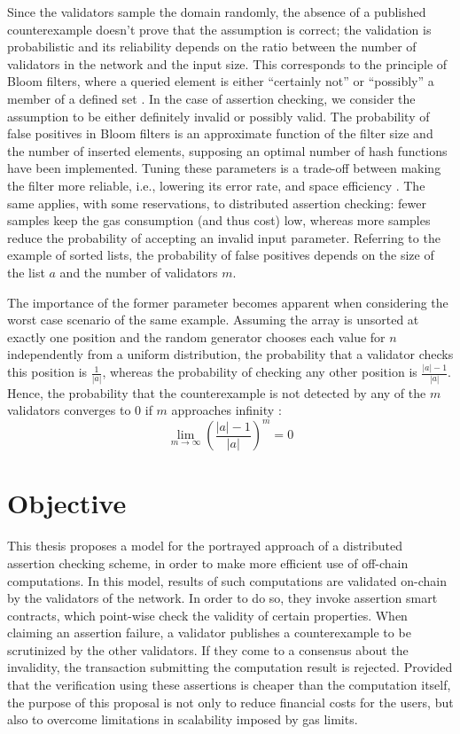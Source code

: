 Since the validators sample the domain randomly, the absence of a published counterexample doesn't prove that the assumption is correct; the validation is probabilistic and its reliability depends on the ratio between the number of validators in the network and the input size. This corresponds to the principle of Bloom filters, where a queried element is either ``certainly not'' or ``possibly'' a member of a defined set \cite{blustein_bloom_2002}. In the case of assertion checking, we consider the assumption to be either definitely invalid or possibly valid. The probability of false positives in Bloom filters is an approximate function of the filter size and the number of inserted elements, supposing an optimal number of hash functions have been implemented. Tuning these parameters is a trade-off between making the filter more reliable, i.e., lowering its error rate, and space efficiency \cite{blustein_bloom_2002}. The same applies, with some reservations, to distributed assertion checking: fewer samples keep the gas consumption (and thus cost) low, whereas more samples reduce the probability of accepting an invalid input parameter. Referring to the example of sorted lists, the probability of false positives depends on the size of the list $a$ and the number of validators $m$.

The importance of the former parameter becomes apparent when considering the worst case scenario of the same example. Assuming the array is unsorted at exactly one position and the random generator chooses each value for $n$ independently from a uniform distribution, the probability that a validator checks this position is $\frac{1}{|a|}$, whereas the probability of checking any other position is $\frac{|a|-1}{|a|}$. Hence, the probability that the counterexample is not detected by any of the $m$ validators converges to 0 if $m$ approaches infinity \cite{thiemann_2020}:
\begin{equation}\label{eq:limes_validators}
	\lim_{m\to\infty} \left(\frac{|a|-1}{|a|}\right)^m = 0
\end{equation}

\section{Objective}
This thesis proposes a model for the portrayed approach of a distributed assertion checking scheme, in order to make more efficient use of off-chain computations. In this model, results of such computations are validated on-chain by the validators of the network. In order to do so, they invoke assertion smart contracts, which point-wise check the validity of certain properties. When claiming an assertion failure, a validator publishes a counterexample to be scrutinized by the other validators. If they come to a consensus about the invalidity, the transaction submitting the computation result is rejected. Provided that the verification using these assertions is cheaper than the computation itself, the purpose of this proposal is not only to reduce financial costs for the users, but also to overcome limitations in scalability imposed by gas limits.

